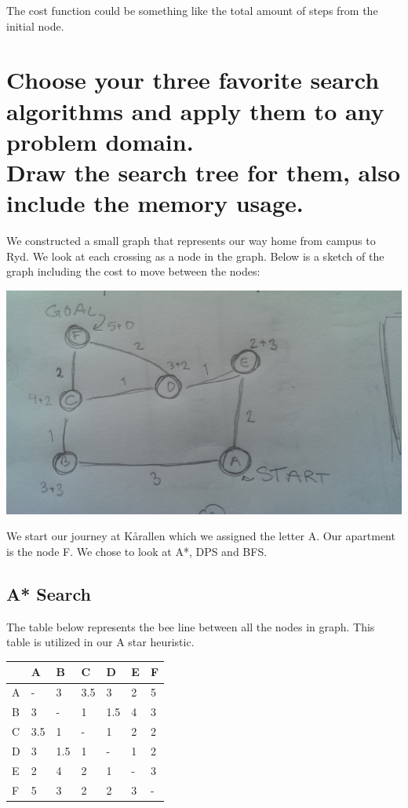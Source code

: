 \documentclass{article}
\begin{document}
The cost function could be something like the total amount of steps from the initial node.

\newpage

\section*{Choose your three favorite search algorithms and apply them to any problem domain.\\Draw the search tree for them, also include the memory usage.}

We constructed a small graph that represents our way home from campus to Ryd. We look at each crossing as a node in the graph.
Below is a sketch of the graph including the cost to move between the nodes:

\includegraphics[scale=0.1]{graph}

We start our journey at Kårallen which we assigned the letter A. Our apartment is the node F. We chose to look at A*, DPS and BFS.

\subsection*{A* Search}

The table below represents the bee line between all the nodes in graph. This table is utilized in our A star heuristic.

\begin{center}
	\begin{table}[h]
		\begin{tabular}{|l|l|l|l|l|l|l|}
			\hline
			   & A 		& B 	& C 	& D 	& E 	& F \\
			\hline
			A  & - 		& 3 	& 3.5	& 3 	& 2 	& 5 \\
			\hline
			B  & 3 		& - 	& 1 	& 1.5 	& 4 	& 3 \\
			\hline
			C  & 3.5	& 1 	& - 	& 1 	& 2 	& 2 \\
			\hline
			D  & 3 		& 1.5 	& 1 	& - 	& 1 	& 2 \\
			\hline
			E  & 2 		& 4 	& 2 	& 1 	& -	 	& 3 \\
			\hline
			F  & 5 		& 3 	& 2 	& 2 	& 3 	& - \\
			\hline
		\end{tabular}
	\end{table}
\end{center}
\end{document}
